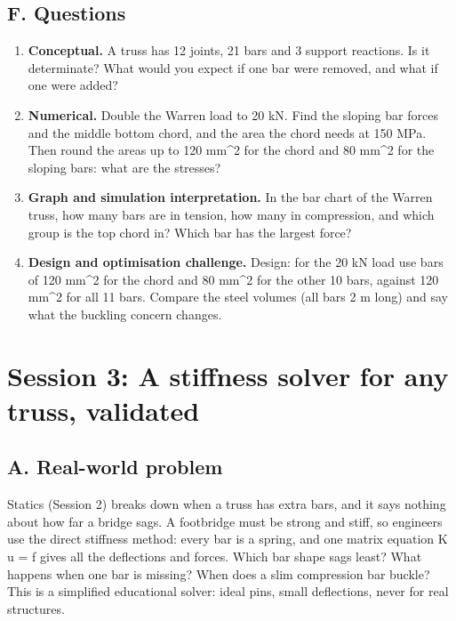 \documentclass[11pt,a4paper]{article}
\begin{document}
\subsection*{F. Questions}
\begin{enumerate}[nosep]
\item \textbf{Conceptual.} A truss has 12 joints, 21 bars and 3 support reactions. Is it determinate? What would you expect if one bar were removed, and what if one were added?
\item \textbf{Numerical.} Double the Warren load to 20 kN. Find the sloping bar forces and the middle bottom chord, and the area the chord needs at 150 MPa. Then round the areas up to 120 mm\textasciicircum{}2 for the chord and 80 mm\textasciicircum{}2 for the sloping bars: what are the stresses?
\item \textbf{Graph and simulation interpretation.} In the bar chart of the Warren truss, how many bars are in tension, how many in compression, and which group is the top chord in? Which bar has the largest force?
\item \textbf{Design and optimisation challenge.} Design: for the 20 kN load use bars of 120 mm\textasciicircum{}2 for the chord and 80 mm\textasciicircum{}2 for the other 10 bars, against 120 mm\textasciicircum{}2 for all 11 bars. Compare the steel volumes (all bars 2 m long) and say what the buckling concern changes.
\end{enumerate}

\section{Session 3: A stiffness solver for any truss, validated}

\subsection*{A. Real-world problem}
Statics (Session 2) breaks down when a truss has extra bars, and it says nothing about how far a bridge sags. A footbridge must be strong and stiff, so engineers use the direct stiffness method: every bar is a spring, and one matrix equation K u = f gives all the deflections and forces. Which bar shape sags least? What happens when one bar is missing? When does a slim compression bar buckle? This is a simplified educational solver: ideal pins, small deflections, never for real structures.
\end{document}
